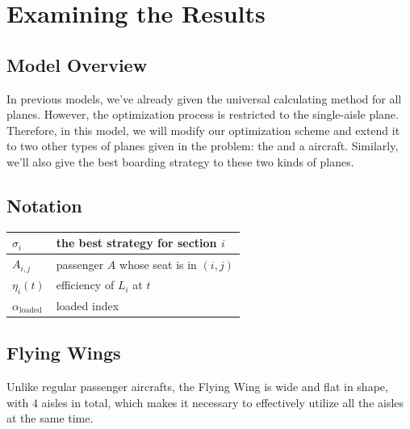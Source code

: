 \documentclass{article}
\theoremstyle{definition}
\theoremstyle{remark}
\numberwithin{equation}{section}
\begin{document}
	\section{Examining the Results}
	\subsection{Model Overview}
	In previous models, we've already given the universal calculating method for all planes. However, the optimization process is restricted to the single-aisle plane. Therefore, in this model, we will modify our optimization scheme and extend it to two other types of planes given in the problem: the  and a  aircraft. Similarly, we'll also give the best boarding strategy to these two kinds of planes.
	\subsection{Notation}
	\begin{center}
	\begin{tabular}{|l|l|}
		\hline
		$\sigma_i$&the best strategy for section $i$\\
		\hline
		$A_{i,j}$&passenger $A$ whose seat is in $\left(i,j\right)$\\
		\hline
		$\eta_i(t)$&efficiency of $L_i$ at $t$\\
		\hline
		$\alpha_\text{loaded}$&loaded index\\
		\hline
	\end{tabular}
	\end{center}
	\subsection{Flying Wings}
	Unlike regular passenger aircrafts, the Flying Wing is wide and flat in shape, with \(4\) aisles in total, which makes it necessary to effectively utilize all the aisles at the same time.
\end{document}
